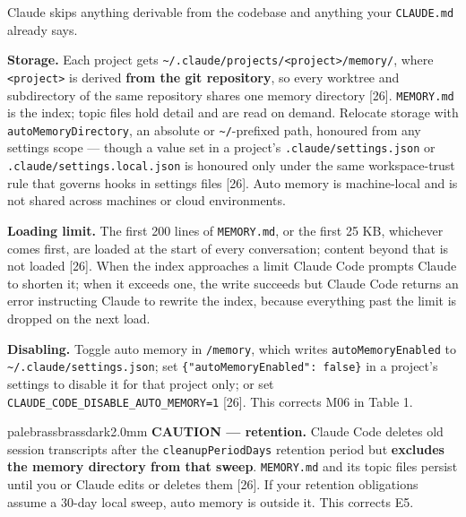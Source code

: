 \documentclass[11pt,a4paper,twoside,openany]{book}
\begin{document}
Claude skips anything derivable from the codebase and anything your \texttt{CLAUDE.\allowbreak{}md} already says.


\textbf{Storage.} Each project gets \texttt{\textasciitilde{}/\allowbreak{}.\allowbreak{}claude/\allowbreak{}projects/\allowbreak{}<project>/\allowbreak{}memory/\allowbreak{}}, where \texttt{<project>} is derived \textbf{from the git repository}, so every worktree and subdirectory of the same repository shares one memory directory [26]. \texttt{MEMORY.\allowbreak{}md} is the index; topic files hold detail and are read on demand. Relocate storage with \texttt{auto\allowbreak{}Memory\allowbreak{}Directory}, an absolute or \texttt{\textasciitilde{}/\allowbreak{}}-prefixed path, honoured from any settings scope — though a value set in a project's \texttt{.\allowbreak{}claude/\allowbreak{}settings.\allowbreak{}json} or \texttt{.\allowbreak{}claude/\allowbreak{}settings.\allowbreak{}local.\allowbreak{}json} is honoured only under the same workspace-trust rule that governs hooks in settings files [26]. Auto memory is machine-local and is not shared across machines or cloud environments.


\textbf{Loading limit.} The first 200 lines of \texttt{MEMORY.\allowbreak{}md}, or the first 25 KB, whichever comes first, are loaded at the start of every conversation; content beyond that is not loaded [26]. When the index approaches a limit Claude Code prompts Claude to shorten it; when it exceeds one, the write succeeds but Claude Code returns an error instructing Claude to rewrite the index, because everything past the limit is dropped on the next load.


\textbf{Disabling.} Toggle auto memory in \texttt{/\allowbreak{}memory}, which writes \texttt{auto\allowbreak{}Memory\allowbreak{}Enabled} to \texttt{\textasciitilde{}/\allowbreak{}.\allowbreak{}claude/\allowbreak{}settings.\allowbreak{}json}; set \texttt{\{"auto\allowbreak{}Memory\allowbreak{}Enabled":\allowbreak{} false\}} in a project's settings to disable it for that project only; or set \texttt{CLAUDE\_\allowbreak{}CODE\_\allowbreak{}DISABLE\_\allowbreak{}AUTO\_\allowbreak{}MEMORY=\allowbreak{}1} [26]. This corrects M06 in Table 1.


\begin{calloutbox}{palebrass}{brassdark}{2.0mm}
\textbf{CAUTION — retention.} Claude Code deletes old session transcripts after the \texttt{cleanup\allowbreak{}Period\allowbreak{}Days} retention period but \textbf{excludes the memory directory from that sweep}. \texttt{MEMORY.\allowbreak{}md} and its topic files persist until you or Claude edits or deletes them [26]. If your retention obligations assume a 30-day local sweep, auto memory is outside it. This corrects E5.
\end{calloutbox}
\end{document}
